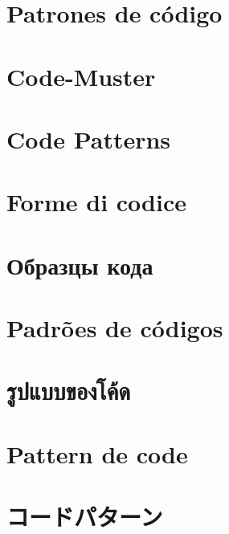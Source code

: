 \ifdefined\SPANISH
\chapter{Patrones de código}
\fi %

\ifdefined\GERMAN
\chapter{Code-Muster}
\fi %

\ifdefined\ENGLISH
\chapter{Code Patterns}
\fi %

\ifdefined\ITALIAN
\chapter{Forme di codice}
\fi %

\ifdefined\RUSSIAN
\chapter{Образцы кода}
\fi %

\ifdefined\BRAZILIAN
\chapter{Padrões de códigos}
\fi %

\ifdefined\THAI
\chapter{รูปแบบของโค้ด}
\fi %

\ifdefined\FRENCH
\chapter{Pattern de code}%
\fi %

\ifdefined\POLISH
\chapter{\PLph{}}
\fi %

\ifdefined\JAPANESE
\chapter{コードパターン}
\fi %

\ifdefined\TURKISH
